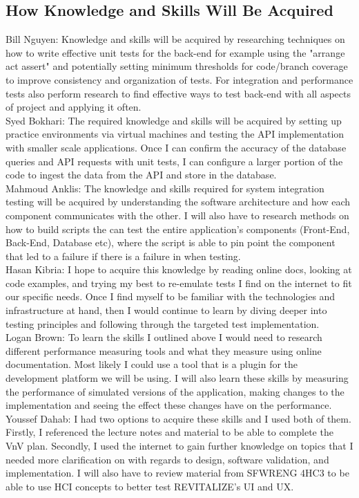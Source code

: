 \documentclass[12pt, titlepage]{article}
\begin{document}
\subsection{How Knowledge and Skills Will Be Acquired}

\noindent Bill Nguyen: Knowledge and skills will be acquired by researching techniques on how to write effective unit tests for the back-end for example using the "arrange act assert" and potentially setting minimum thresholds for code/branch coverage to improve consistency and organization of tests. For integration and performance tests also perform research to find effective ways to test back-end with all aspects of project and applying it often.\\

\noindent Syed Bokhari: The required knowledge and skills will be acquired by setting up practice environments via virtual machines and testing the API implementation with smaller scale applications. Once I can confirm the accuracy of the database queries and API requests with unit tests, I can configure a larger portion of the code to ingest the data from the API and store in the database.\\

\noindent Mahmoud Anklis: The  knowledge and skills required for system integration testing will be acquired by understanding the software architecture and how each component communicates with the other. I will also have to research methods on how to build scripts the can test the entire application's components (Front-End, Back-End, Database etc), where the script is able to pin point the component that led to a failure if there is a failure in when testing.\\

\noindent Hasan Kibria: I hope to acquire this knowledge by reading online docs, looking at code examples, and trying my best to re-emulate tests I find on the internet to fit our specific needs. Once I find myself to be familiar with the technologies and infrastructure at hand, then I would continue to learn by diving deeper into testing principles and following through the targeted test implementation.\\

\noindent Logan Brown: To learn the skills I outlined above I would need to research different performance measuring tools and what they measure using online documentation. Most likely I could use a tool that is a plugin for the development platform we will be using. I will also learn these skills by measuring the performance of simulated versions of the application, making changes to the implementation and seeing the effect these changes have on the performance.\\

\noindent Youssef Dahab: I had two options to acquire these skills and I used both of them. Firstly, I referenced the lecture notes and material to be able to complete the VnV plan. Secondly, I used the internet to gain further knowledge on topics that I needed more clarification on with regards to design, software validation, and implementation. I will also have to review material from SFWRENG 4HC3 to be able to use HCI concepts to better test REVITALIZE's UI and UX.\\
\end{document}
